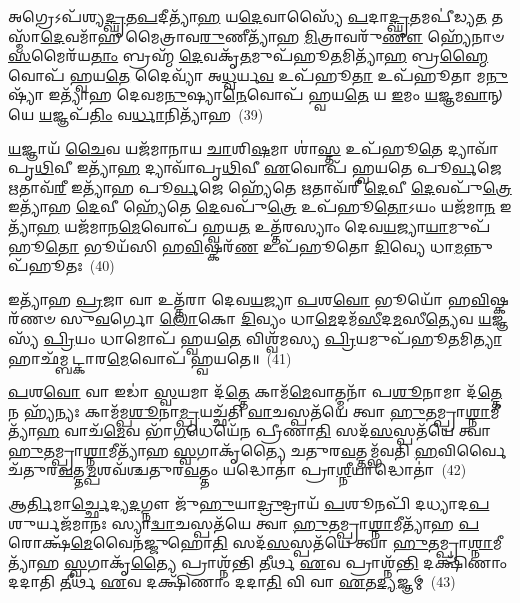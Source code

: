 𑌅𑌗𑍍𑌰𑍇\-𑌽𑌪᳴𑌶𑍍𑌯\-\ul{𑌦𑍍𑌘𑍃}\-𑌤\-\ul{𑌪}\-𑌦𑍀𑌤𑍍𑌯𑌾᳴\-\ul{𑌹} 𑌯\-\ul{𑌦𑍇}\-𑌵𑌾𑌸𑍍𑌯𑍈᳴ \ul{𑌪}\-𑌦𑌾\-\ul{𑌦𑍍𑌘𑍃}\-𑌤𑌮𑌪𑍀॑𑌡𑍍𑌯\-\ul{𑌤} 𑌤𑌸𑍍𑌮𑌾᳴\-\ul{𑌦𑍇}\-𑌵𑌮𑌾᳴𑌹 𑌮𑍈𑌤𑍍𑌰𑌾𑌵\-\ul{𑌰𑍁}\-𑌣𑍀𑌤𑍍𑌯𑌾᳴𑌹 \ul{𑌮𑌿}\-𑌤𑍍𑌰𑌾𑌵𑌰𑍁᳴\-\ul{𑌣𑍗} 𑌹𑍍𑌯𑍇᳴𑌨𑌾𑍞 \ul{𑌸}\-𑌮𑍈𑌰᳴𑌯\-\ul{𑌤𑌾𑌂} 𑌬𑍍𑌰𑌹𑍍𑌮᳴ \ul{𑌦𑍇}\-𑌵𑌕𑍃᳴\-\ul{𑌤}\-𑌮𑍁𑌪᳴𑌹𑍂\-\ul{𑌤}\-𑌮𑌿𑌤𑍍𑌯𑌾᳴\-\ul{𑌹} 𑌬𑍍𑌰\-\ul{𑌹𑍍𑌮𑍈}\-𑌵𑍋𑌪᳴ 𑌹𑍍𑌵𑌯\-\ul{𑌤𑍇} 𑌦𑍈𑌵𑍍𑌯𑌾᳴ 𑌅\-\ul{𑌧𑍍𑌵}\-𑌰𑍍𑌯\-\ul{𑌵} 𑌉𑌪᳴𑌹𑍂\-\ul{𑌤𑌾} 𑌉𑌪᳴𑌹𑍂𑌤𑌾 𑌮\-\ul{𑌨𑍁}\-𑌷𑍍𑌯𑌾᳴ 𑌇𑌤𑍍𑌯𑌾᳴𑌹 𑌦𑍇𑌵𑌮\-\ul{𑌨𑍁}\-𑌷𑍍𑌯𑌾\-\ul{𑌨𑍇}\-𑌵𑍋𑌪᳴ 𑌹𑍍𑌵𑌯\-\ul{𑌤𑍇} 𑌯 \ul{𑌇}\-𑌮𑌂 \ul{𑌯}\-𑌜𑍍𑌞𑌮\-\ul{𑌵𑌾}\-𑌨𑍍 𑌯𑍇 \ul{𑌯}\-𑌜𑍍𑌞𑌪᳴\-\ul{𑌤𑌿𑌂} 𑌵\-\ul{𑌰𑍍𑌧𑌾}\-𑌨𑌿𑌤𑍍𑌯𑌾᳴𑌹~(39)

\-\ul{𑌯}\-𑌜𑍍𑌞𑌾𑌯᳴ \ul{𑌚𑍈}\-𑌵 𑌯𑌜᳴𑌮𑌾𑌨𑌾𑌯 \ul{𑌚𑌾}\-𑌶𑌿\-\ul{𑌷}\-𑌮𑌾 𑌶𑌾॑\-\ul{𑌸𑍍𑌤} 𑌉𑌪᳴𑌹𑍂\-\ul{𑌤𑍇} 𑌦𑍍𑌯𑌾𑌵𑌾᳴𑌪𑍃\-\ul{𑌥𑌿}\-𑌵𑍀 𑌇𑌤𑍍𑌯𑌾᳴\-\ul{𑌹} 𑌦𑍍𑌯𑌾𑌵𑌾᳴𑌪𑍃\-\ul{𑌥𑌿}\-𑌵𑍀 \ul{𑌏}\-𑌵𑍋𑌪᳴ 𑌹𑍍𑌵𑌯𑌤𑍇 𑌪𑍂\-\ul{𑌰𑍍𑌵}\-𑌜𑍇 \ul{𑌋}\-𑌤𑌾𑌵᳴\-\ul{𑌰𑍀} 𑌇𑌤𑍍𑌯𑌾᳴𑌹 𑌪𑍂\-\ul{𑌰𑍍𑌵}\-𑌜𑍇 𑌹𑍍𑌯𑍇᳴𑌤𑍇 \ul{𑌋}\-𑌤𑌾𑌵᳴𑌰𑍀 \ul{𑌦𑍇}\-𑌵𑍀 \ul{𑌦𑍇}\-𑌵𑌪𑍁᳴\-\ul{𑌤𑍍𑌰𑍇} 𑌇𑌤𑍍𑌯𑌾᳴𑌹 \ul{𑌦𑍇}\-𑌵𑍀 𑌹𑍍𑌯𑍇᳴𑌤𑍇 \ul{𑌦𑍇}\-𑌵𑌪𑍁᳴\-\ul{𑌤𑍍𑌰𑍇} 𑌉𑌪᳴𑌹𑍂\-\ul{𑌤𑍋}\-\-𑌽𑌯𑌂 𑌯𑌜᳴𑌮𑌾\-\ul{𑌨} 𑌇𑌤𑍍𑌯𑌾᳴\-\ul{𑌹} 𑌯𑌜᳴𑌮𑌾𑌨\-\ul{𑌮𑍇}\-𑌵𑍋𑌪᳴ 𑌹𑍍𑌵𑌯\-\ul{𑌤} 𑌉𑌤𑍍𑌤᳴𑌰𑌸𑍍𑌯𑌾𑌂 𑌦𑍇𑌵\-\ul{𑌯}\-𑌜𑍍𑌯𑌾\-\ul{𑌯𑌾}\-𑌮𑍁𑌪᳴𑌹𑍂\-\ul{𑌤𑍋} 𑌭𑍂𑌯᳴𑌸𑌿 𑌹\-\ul{𑌵𑌿}\-𑌷𑍍𑌕𑌰᳴\-\ul{𑌣} 𑌉𑌪᳴𑌹𑍂𑌤𑍋 \ul{𑌦𑌿}\-𑌵𑍍𑌯𑍇 𑌧𑌾\-\ul{𑌮}\-𑌨𑍍𑌨𑍁𑌪᳴𑌹𑍂𑌤𑌃~(40)

𑌇𑌤𑍍𑌯𑌾᳴𑌹 \ul{𑌪𑍍𑌰}\-𑌜𑌾 𑌵𑌾 𑌉𑌤𑍍𑌤᳴𑌰𑌾 𑌦𑍇𑌵\-\ul{𑌯}\-𑌜𑍍𑌯𑌾 \ul{𑌪}\-𑌶\-\ul{𑌵𑍋} 𑌭𑍂𑌯𑍋᳴ 𑌹\-\ul{𑌵𑌿}\-𑌷𑍍𑌕𑌰᳴𑌣𑍞 𑌸𑍁\-\ul{𑌵}\-𑌰𑍍𑌗𑍋 \ul{𑌲𑍋}\-𑌕𑍋 \ul{𑌦𑌿}\-𑌵𑍍𑌯𑌂 𑌧𑌾\-\ul{𑌮𑍇}\-𑌦𑌮᳴\-\ul{𑌸𑍀}\-𑌦\-\ul{𑌮}\-𑌸𑍀\-\ul{𑌤𑍍𑌯𑍇}\-𑌵 \ul{𑌯}\-𑌜𑍍𑌞𑌸𑍍𑌯᳴ \ul{𑌪𑍍𑌰𑌿}\-𑌯𑌂 𑌧𑌾𑌮𑍋𑌪᳴ 𑌹𑍍𑌵𑌯\-\ul{𑌤𑍇} 𑌵𑌿𑌶𑍍𑌵᳴𑌮𑌸𑍍𑌯 \ul{𑌪𑍍𑌰𑌿}\-𑌯𑌮𑍁𑌪᳴𑌹𑍂\-\ul{𑌤}\-𑌮𑌿\-\ul{𑌤𑍍𑌯𑌾}\-𑌹𑌾𑌛᳴𑌮𑍍𑌬𑌟𑍍𑌕𑌾𑌰\-\ul{𑌮𑍇}\-𑌵𑍋𑌪᳴ 𑌹𑍍𑌵𑌯𑌤𑍇॥~(41)

{\anuvakamend[{\-\ul{𑌆}\-\-\ul{𑌹} \ul{𑌧𑍇}\-𑌨𑍁\-\ul{𑌰𑍇}\-𑌤𑌾𑌂 𑌵\-\ul{𑌰𑍍𑌧𑌾}\-𑌨𑌿𑌤𑍍𑌯𑌾᳴\-\ul{𑌹} 𑌧𑌾\-\ul{𑌮}\-𑌨𑍍𑌨𑍁𑌪᳴𑌹𑍂\-\ul{𑌤}\-𑌶𑍍𑌚𑌤𑍁᳴𑌸𑍍𑌤𑍍𑌰𑌿𑍞𑌶𑌚𑍍𑌚}]}%

\-\ul{𑌪}\-𑌶\-\ul{𑌵𑍋} 𑌵𑌾 𑌇𑌡𑌾॑ \ul{𑌸𑍍𑌵}\-𑌯𑌮𑌾 𑌦᳴\-\ul{𑌤𑍍𑌤𑍇} 𑌕𑌾𑌮᳴\-\ul{𑌮𑍇}\-𑌵𑌾𑌤𑍍𑌮𑌨𑌾᳴ 𑌪\-\ul{𑌶𑍂}\-𑌨𑌾𑌮𑌾 𑌦᳴\-\ul{𑌤𑍍𑌤𑍇} 𑌨 𑌹𑍍𑌯᳴𑌨𑍍𑌯𑌃 𑌕𑌾𑌮᳴𑌮𑍍𑌪\-\ul{𑌶𑍂}\-𑌨𑌾\-\ul{𑌮𑍍𑌪𑍍𑌰}\-𑌯𑌚𑍍𑌛᳴𑌤𑌿 \ul{𑌵𑌾}\-𑌚𑌸𑍍𑌪𑌤᳴𑌯𑍇 𑌤𑍍𑌵𑌾 \ul{𑌹𑍁}\-𑌤𑌮𑍍𑌪𑍍𑌰𑌾\-\ul{𑌶𑍍𑌨𑌾}\-𑌮𑍀𑌤𑍍𑌯𑌾᳴\-\ul{𑌹} 𑌵𑌾𑌚᳴\-\ul{𑌮𑍇}\-𑌵 𑌭𑌾᳴\-\ul{𑌗}\-𑌧𑍇𑌯𑍇᳴𑌨 𑌪𑍍𑌰𑍀𑌣𑌾\-\ul{𑌤𑌿} 𑌸𑌦᳴\-\ul{𑌸}\-𑌸𑍍𑌪𑌤᳴𑌯𑍇 𑌤𑍍𑌵𑌾 \ul{𑌹𑍁}\-𑌤𑌮𑍍𑌪𑍍𑌰𑌾\-\ul{𑌶𑍍𑌨𑌾}\-𑌮𑍀𑌤𑍍𑌯𑌾᳴𑌹 \ul{𑌸𑍍𑌵}\-𑌗𑌾𑌕𑍃᳴𑌤𑍍𑌯𑍈 𑌚𑌤𑍁𑌰\-\ul{𑌵}\-𑌤𑍍𑌤𑌮𑍍𑌭᳴𑌵𑌤𑌿 \ul{𑌹}\-𑌵𑌿𑌰𑍍𑌵𑍈 𑌚᳴𑌤𑍁𑌰\-\ul{𑌵}\-𑌤𑍍𑌤\-\ul{𑌮𑍍𑌪}\-𑌶𑌵᳴𑌶𑍍𑌚𑌤𑍁𑌰\-\ul{𑌵}\-𑌤𑍍𑌤𑌂 𑌯𑌦𑍍𑌧𑍋𑌤𑌾॑ 𑌪𑍍𑌰𑌾\-\ul{𑌶𑍍𑌨𑍀}\-𑌯𑌾𑌦𑍍𑌧𑍋𑌤𑌾॑~(42)

𑌆\-\ul{𑌰𑍍𑌤𑌿}\-𑌮𑌾\-\ul{𑌰𑍍𑌚𑍍𑌛𑍇}\-𑌦𑍍𑌯\-\ul{𑌦}\-𑌗𑍍𑌨𑍗 𑌜𑍁᳴\-\ul{𑌹𑍁}\-𑌯𑌾\-\ul{𑌦𑍍𑌰𑍁}\-𑌦𑍍𑌰𑌾𑌯᳴ \ul{𑌪}\-𑌶𑍂𑌨𑌪𑌿᳴ 𑌦𑌧𑍍𑌯𑌾𑌦\-\ul{𑌪}\-𑌶𑍁𑌰𑍍𑌯𑌜᳴𑌮𑌾𑌨𑌃 𑌸𑍍𑌯𑌾\-\ul{𑌦𑍍𑌵𑌾}\-𑌚𑌸𑍍𑌪𑌤᳴𑌯𑍇 𑌤𑍍𑌵𑌾 \ul{𑌹𑍁}\-𑌤𑌮𑍍𑌪𑍍𑌰𑌾\-\ul{𑌶𑍍𑌨𑌾}\-𑌮𑍀𑌤𑍍𑌯𑌾᳴𑌹 \ul{𑌪}\-𑌰𑍋𑌕𑍍𑌷᳴\-\ul{𑌮𑍇}\-𑌵𑍈𑌨᳴𑌜𑍍𑌜𑍁𑌹𑍋\-\ul{𑌤𑌿} 𑌸𑌦᳴\-\ul{𑌸}\-𑌸𑍍𑌪𑌤᳴𑌯𑍇 𑌤𑍍𑌵𑌾 \ul{𑌹𑍁}\-𑌤𑌮𑍍𑌪𑍍𑌰𑌾\-\ul{𑌶𑍍𑌨𑌾}\-𑌮𑍀𑌤𑍍𑌯𑌾᳴𑌹 \ul{𑌸𑍍𑌵}\-𑌗𑌾𑌕𑍃᳴\-\ul{𑌤𑍍𑌯𑍈} 𑌪𑍍𑌰𑌾𑌶𑍍𑌨᳴𑌨𑍍𑌤𑌿 \ul{𑌤𑍀}\-𑌰𑍍𑌥 \ul{𑌏}\-𑌵 𑌪𑍍𑌰𑌾𑌶𑍍𑌨᳴\-\ul{𑌨𑍍𑌤𑌿} 𑌦𑌕𑍍𑌷𑌿᳴𑌣𑌾𑌂 𑌦𑌦𑌾𑌤𑌿 \ul{𑌤𑍀}\-𑌰𑍍𑌥 \ul{𑌏}\-𑌵 𑌦𑌕𑍍𑌷𑌿᳴𑌣𑌾𑌂 𑌦𑌦𑌾\-\ul{𑌤𑌿} 𑌵𑌿 𑌵𑌾 \ul{𑌏}\-𑌤\-\ul{𑌦𑍍𑌯}\-𑌜𑍍𑌞𑌮𑍍~(43)

